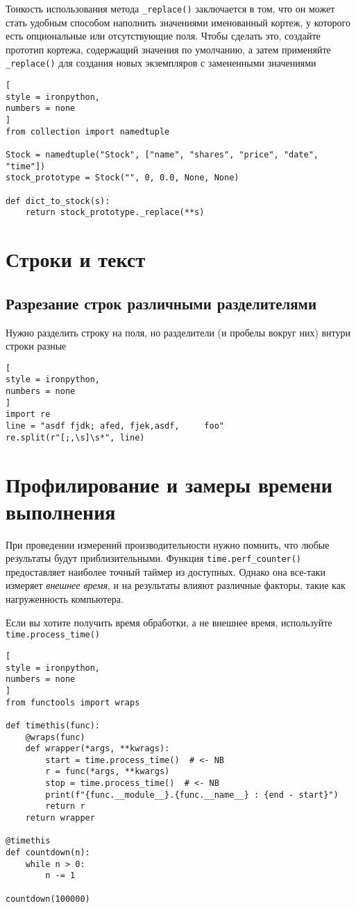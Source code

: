 \documentclass[%
	11pt,
	a4paper,
	utf8,
		]{article}
\begin{document}
Тонкость использования метода \verb|_replace()| заключается в том, что он может стать удобным способом наполнить значениями именованный кортеж, у которого есть опциональные или отсутствующие поля. Чтобы сделать это, создайте прототип кортежа, содержащий значения по умолчанию, а затем применяйте \verb|_replace()| для создания новых экземпляров с замененными значениями
\begin{lstlisting}[
style = ironpython,
numbers = none
]
from collection import namedtuple

Stock = namedtuple("Stock", ["name", "shares", "price", "date", "time"])
stock_prototype = Stock("", 0, 0.0, None, None)

def dict_to_stock(s):
    return stock_prototype._replace(**s)
\end{lstlisting}

\section{Строки и текст}

\subsection{Разрезание строк различными разделителями}

Нужно разделить строку на поля, но разделители (и пробелы вокруг них) внтури строки разные
\begin{lstlisting}[
style = ironpython,
numbers = none
]
import re
line = "asdf fjdk; afed, fjek,asdf,     foo"
re.split(r"[;,\s]\s*", line)
\end{lstlisting}





\section{Профилирование и замеры времени выполнения}

При проведении измерений производительности нужно помнить, что любые результаты будут приблизительными. Функция \texttt{time.perf\_counter()} предоставляет наиболее точный таймер из доступных. Однако она все-таки измеряет \emph{внешнее время}, и {\color{red}на результаты влияют различные факторы, такие как нагруженность компьютера}.

Если вы хотите получить время обработки, а не внешнее время, используйте \texttt{time.process\_time()} \cite[]{beazley:python_cookbook-2019}
\begin{lstlisting}[
style = ironpython,
numbers = none
]
from functools import wraps

def timethis(func):
    @wraps(func)
    def wrapper(*args, **kwrags):
        start = time.process_time()  # <- NB
        r = func(*args, **kwargs)
        stop = time.process_time()  # <- NB
        print(f"{func.__module__}.{func.__name__} : {end - start}")
        return r
    return wrapper
    
@timethis
def countdown(n):
    while n > 0:
        n -= 1

countdown(100000)
\end{lstlisting}
\end{document}
